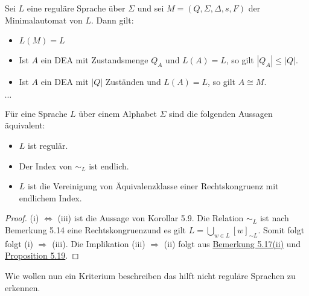  Sei $L$ eine reguläre Sprache über $\Sigma$ und sei $M = (Q, \Sigma, \Delta, s, F)$ der Minimalautomat von $L$. Dann gilt:
\begin{itemize}
  \item [(i)] $L(M) = L$
  \item [(ii)] Ist $A$ ein DEA mit Zustandsmenge $Q_A$ und $L(A) = L$, so gilt $|Q_A| \leq |Q|$.
  \item [(iii)] Ist $A$ ein DEA mit $|Q|$ Zuständen und $L(A) = L$, so gilt $A \cong M$. 
\end{itemize}

$\cdots$

Für eine Sprache $L$ über einem Alphabet $\Sigma$ sind die folgenden Aussagen äquivalent:
\begin{itemize}
  \item [(i)] $L$ ist regulär.
  \item [(ii)] Der Index von $\sim_{L}$ ist endlich.
  \item [(iii)] $L$ ist die Vereinigung von Äquivalenzklasse einer Rechtskongruenz mit endlichem Index.
\end{itemize}

\begin{proof}
  (i) $\Leftrightarrow$ (iii) ist die Aussage von Korollar 5.9. Die Relation $\sim_L$ ist nach Bemerkung 5.14 eine Rechtskongruenzund es gilt $L = \bigcup \limits_{w \in L} [w]_{\sim L}$. Somit folgt folgt (i) $\Rightarrow$ (iii). Die Implikation (iii) $\Rightarrow$ (ii) folgt aus \hyperref[subsec:5.17]{Bemerkung 5.17(ii)} und \hyperref[subsec:5.19]{Proposition 5.19}.
\end{proof}

Wie wollen nun ein Kriterium beschreiben das hilft nicht reguläre Sprachen zu erkennen.

